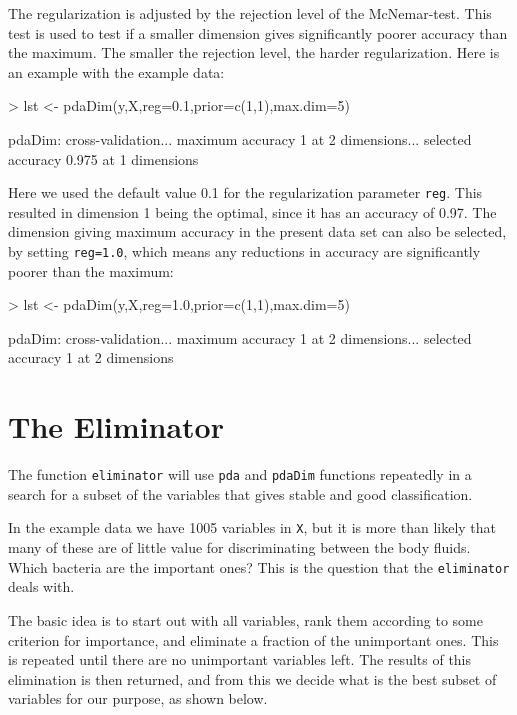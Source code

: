 \documentclass[a4paper]{article}
\begin{document}
The regularization is adjusted by the rejection level of the McNemar-test. This test is used to test if a smaller dimension gives significantly poorer accuracy than the maximum. The smaller the rejection level, the harder regularization. Here is an example with the example data:
\begin{Schunk}
\begin{Sinput}
> lst <- pdaDim(y,X,reg=0.1,prior=c(1,1),max.dim=5)
\end{Sinput}
\begin{Soutput}
pdaDim:
  cross-validation...
   maximum accuracy 1 at 2 dimensions...
   selected accuracy 0.975 at 1 dimensions
\end{Soutput}
\end{Schunk}
Here we used the default value 0.1 for the regularization parameter \texttt{reg}. This resulted in dimension 1 being the optimal, since it has an accuracy of 0.97. The dimension giving maximum accuracy in the present data set can also be selected, by setting \texttt{reg=1.0}, which means any reductions in accuracy are significantly poorer than the maximum:
\begin{Schunk}
\begin{Sinput}
> lst <- pdaDim(y,X,reg=1.0,prior=c(1,1),max.dim=5)
\end{Sinput}
\begin{Soutput}
pdaDim:
  cross-validation...
   maximum accuracy 1 at 2 dimensions...
   selected accuracy 1 at 2 dimensions
\end{Soutput}
\end{Schunk}



\section{The Eliminator}
The function \texttt{eliminator} will use \texttt{pda} and \texttt{pdaDim} functions repeatedly in a search for a subset of the variables that gives stable and good classification.

In the example data we have 1005 variables in \texttt{X}, but it is more than likely that many of these are of little value for discriminating between the body fluids. Which bacteria are the important ones? This is the question that the \texttt{eliminator} deals with.

The basic idea is to start out with all variables, rank them according to some criterion for importance, and eliminate a fraction of the unimportant ones. This is repeated until there are no unimportant variables left. The results of this elimination is then returned, and from this we decide what is the best subset of variables for our purpose, as shown below.
\end{document}
